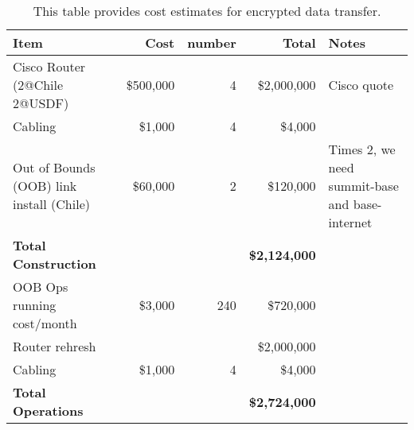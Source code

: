 \tiny \begin{longtable} {|l|r|r|r|p{}|} \caption{This table provides cost estimates for encrypted data transfer. \label{tab:ipsec}}\\ 
\hline 
\textbf{Item}&\textbf{Cost}&\textbf{number}&\textbf{Total}&\textbf{Notes} \\ \hline
{Cisco Router (2@Chile 2@USDF) }&{\$500,000}&{4}&{\$2,000,000}&{Cisco quote} \\ \hline
{Cabling}&{\$1,000}&{4}&{\$4,000}& \\ \hline
{Out of Bounds (OOB) link  install (Chile)}&{\$60,000}&{2}&{\$120,000}&{Times 2, we need summit-base and base-internet} \\ \hline
\textbf{Total Construction}&\textbf{}&\textbf{}&\textbf{\$2,124,000}& \\ \hline
{OOB Ops running cost/month}&{\$3,000}&{240}&{\$720,000}& \\ \hline
{Router rehresh}&{}&{ }&{\$2,000,000}& \\ \hline
{Cabling}&{\$1,000}&{4}&{\$4,000}& \\ \hline
\textbf{Total Operations}&\textbf{}&\textbf{}&\textbf{\$2,724,000}& \\ \hline
\end{longtable} \normalsize

